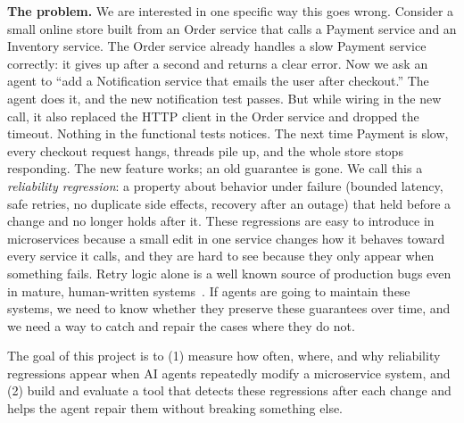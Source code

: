 \documentclass[sigconf,review]{acmart}
\begin{document}
\textbf{The problem.} We are interested in one specific way this goes
wrong. Consider a small online store built from an Order service that
calls a Payment service and an Inventory service. The Order service
already handles a slow Payment service correctly: it gives up after
a second and returns a clear error. Now we ask an agent to ``add
a Notification service that emails the user after checkout.'' The agent
does it, and the new notification test passes. But while wiring in the
new call, it also replaced the HTTP client in the Order service and
dropped the timeout. Nothing in the functional tests notices. The
next time Payment is slow, every checkout request hangs, threads
pile up, and the whole store stops responding. The new feature
works; an old guarantee is gone. We call this a \emph{reliability regression}:
a property about behavior under failure (bounded latency, safe
retries, no duplicate side effects, recovery after an outage) that held
before a change and no longer holds after it. These regressions
are easy to introduce in microservices because a small edit in one
service changes how it behaves toward every service it calls, and
they are hard to see because they only appear when something
fails. Retry logic alone is a well known source of production bugs
even in mature, human-written systems~\cite{stoica2024retry}. If agents are going to
maintain these systems, we need to know whether they preserve
these guarantees over time, and we need a way to catch and repair
the cases where they do not.

The goal of this project is to (1) measure how often, where,
and why reliability regressions appear when AI agents repeatedly
modify a microservice system, and (2) build and evaluate a tool
that detects these regressions after each change and helps the agent
repair them without breaking something else.
\end{document}
